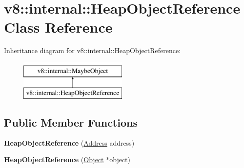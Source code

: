 \hypertarget{classv8_1_1internal_1_1HeapObjectReference}{}\section{v8\+:\+:internal\+:\+:Heap\+Object\+Reference Class Reference}
\label{classv8_1_1internal_1_1HeapObjectReference}
Inheritance diagram for v8\+:\+:internal\+:\+:Heap\+Object\+Reference\+:\begin{figure}[H]
\begin{center}
\leavevmode
\includegraphics[height=2.000000cm]{classv8_1_1internal_1_1HeapObjectReference}
\end{center}
\end{figure}
\subsection*{Public Member Functions}
\begin{DoxyCompactItemize}
\item 
\mbox{\label{classv8_1_1internal_1_1HeapObjectReference_adaf764b25d84a93e068e1533e38d4cad}} 
{\bfseries Heap\+Object\+Reference} (\mbox{\hyperlink{classuintptr__t}{Address}} address)
\item 
\mbox{\label{classv8_1_1internal_1_1HeapObjectReference_a613486bc1d147f2fb6095ef20c8437b7}} 
{\bfseries Heap\+Object\+Reference} (\mbox{\hyperlink{classv8_1_1internal_1_1Object}{Object}} $\ast$object)
\end{DoxyCompactItemize}
